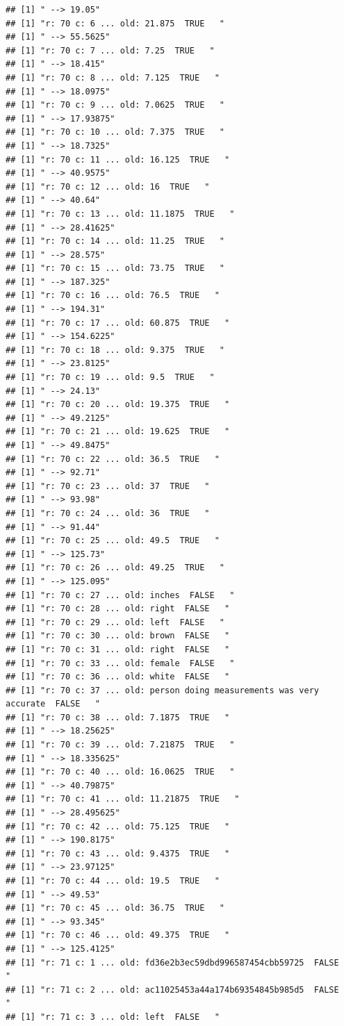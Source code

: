 \documentclass[]{article}
\begin{document}
\begin{verbatim}
## [1] " --> 19.05"
## [1] "r: 70 c: 6 ... old: 21.875  TRUE   "
## [1] " --> 55.5625"
## [1] "r: 70 c: 7 ... old: 7.25  TRUE   "
## [1] " --> 18.415"
## [1] "r: 70 c: 8 ... old: 7.125  TRUE   "
## [1] " --> 18.0975"
## [1] "r: 70 c: 9 ... old: 7.0625  TRUE   "
## [1] " --> 17.93875"
## [1] "r: 70 c: 10 ... old: 7.375  TRUE   "
## [1] " --> 18.7325"
## [1] "r: 70 c: 11 ... old: 16.125  TRUE   "
## [1] " --> 40.9575"
## [1] "r: 70 c: 12 ... old: 16  TRUE   "
## [1] " --> 40.64"
## [1] "r: 70 c: 13 ... old: 11.1875  TRUE   "
## [1] " --> 28.41625"
## [1] "r: 70 c: 14 ... old: 11.25  TRUE   "
## [1] " --> 28.575"
## [1] "r: 70 c: 15 ... old: 73.75  TRUE   "
## [1] " --> 187.325"
## [1] "r: 70 c: 16 ... old: 76.5  TRUE   "
## [1] " --> 194.31"
## [1] "r: 70 c: 17 ... old: 60.875  TRUE   "
## [1] " --> 154.6225"
## [1] "r: 70 c: 18 ... old: 9.375  TRUE   "
## [1] " --> 23.8125"
## [1] "r: 70 c: 19 ... old: 9.5  TRUE   "
## [1] " --> 24.13"
## [1] "r: 70 c: 20 ... old: 19.375  TRUE   "
## [1] " --> 49.2125"
## [1] "r: 70 c: 21 ... old: 19.625  TRUE   "
## [1] " --> 49.8475"
## [1] "r: 70 c: 22 ... old: 36.5  TRUE   "
## [1] " --> 92.71"
## [1] "r: 70 c: 23 ... old: 37  TRUE   "
## [1] " --> 93.98"
## [1] "r: 70 c: 24 ... old: 36  TRUE   "
## [1] " --> 91.44"
## [1] "r: 70 c: 25 ... old: 49.5  TRUE   "
## [1] " --> 125.73"
## [1] "r: 70 c: 26 ... old: 49.25  TRUE   "
## [1] " --> 125.095"
## [1] "r: 70 c: 27 ... old: inches  FALSE   "
## [1] "r: 70 c: 28 ... old: right  FALSE   "
## [1] "r: 70 c: 29 ... old: left  FALSE   "
## [1] "r: 70 c: 30 ... old: brown  FALSE   "
## [1] "r: 70 c: 31 ... old: right  FALSE   "
## [1] "r: 70 c: 33 ... old: female  FALSE   "
## [1] "r: 70 c: 36 ... old: white  FALSE   "
## [1] "r: 70 c: 37 ... old: person doing measurements was very accurate  FALSE   "
## [1] "r: 70 c: 38 ... old: 7.1875  TRUE   "
## [1] " --> 18.25625"
## [1] "r: 70 c: 39 ... old: 7.21875  TRUE   "
## [1] " --> 18.335625"
## [1] "r: 70 c: 40 ... old: 16.0625  TRUE   "
## [1] " --> 40.79875"
## [1] "r: 70 c: 41 ... old: 11.21875  TRUE   "
## [1] " --> 28.495625"
## [1] "r: 70 c: 42 ... old: 75.125  TRUE   "
## [1] " --> 190.8175"
## [1] "r: 70 c: 43 ... old: 9.4375  TRUE   "
## [1] " --> 23.97125"
## [1] "r: 70 c: 44 ... old: 19.5  TRUE   "
## [1] " --> 49.53"
## [1] "r: 70 c: 45 ... old: 36.75  TRUE   "
## [1] " --> 93.345"
## [1] "r: 70 c: 46 ... old: 49.375  TRUE   "
## [1] " --> 125.4125"
## [1] "r: 71 c: 1 ... old: fd36e2b3ec59dbd996587454cbb59725  FALSE   "
## [1] "r: 71 c: 2 ... old: ac11025453a44a174b69354845b985d5  FALSE   "
## [1] "r: 71 c: 3 ... old: left  FALSE   "

\end{verbatim}
\end{document}
